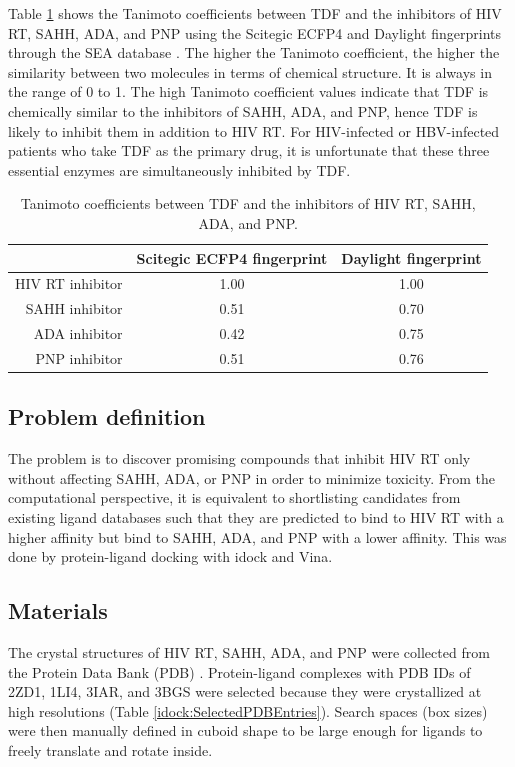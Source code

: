 Table \ref{idock:TanimotoCoefficients} shows the Tanimoto coefficients between TDF and the inhibitors of HIV RT, SAHH, ADA, and PNP using the Scitegic ECFP4 and Daylight fingerprints through the SEA database \citep{380}. The higher the Tanimoto coefficient, the higher the similarity between two molecules in terms of chemical structure. It is always in the range of 0 to 1. The high Tanimoto coefficient values indicate that TDF is chemically similar to the inhibitors of SAHH, ADA, and PNP, hence TDF is likely to inhibit them in addition to HIV RT. For HIV-infected or HBV-infected patients who take TDF as the primary drug, it is unfortunate that these three essential enzymes are simultaneously inhibited by TDF.

\begin{table}
\centering
\begin{tabular*}
{\linewidth}
{@{\extracolsep{\fill}}rcc}
\toprule
& Scitegic ECFP4 fingerprint & Daylight fingerprint\\
\midrule
HIV RT inhibitor & 1.00 & 1.00 \\
  SAHH inhibitor & 0.51 & 0.70 \\
   ADA inhibitor & 0.42 & 0.75 \\
   PNP inhibitor & 0.51 & 0.76 \\
\bottomrule
\end{tabular*}
\caption{Tanimoto coefficients between TDF and the inhibitors of HIV RT, SAHH, ADA, and PNP.}
\label{idock:TanimotoCoefficients}
\end{table}

\subsection{Problem definition}

The problem is to discover promising compounds that inhibit HIV RT only without affecting SAHH, ADA, or PNP in order to minimize toxicity. From the computational perspective, it is equivalent to shortlisting candidates from existing ligand databases such that they are predicted to bind to HIV RT with a higher affinity but bind to SAHH, ADA, and PNP with a lower affinity. This was done by protein-ligand docking with idock and Vina.

\subsection{Materials}

The crystal structures of HIV RT, SAHH, ADA, and PNP were collected from the Protein Data Bank (PDB) \citep{539,537}. Protein-ligand complexes with PDB IDs of 2ZD1, 1LI4, 3IAR, and 3BGS were selected because they were crystallized at high resolutions (Table \ref{idock:SelectedPDBEntries}). Search spaces (box sizes) were then manually defined in cuboid shape to be large enough for ligands to freely translate and rotate inside.

